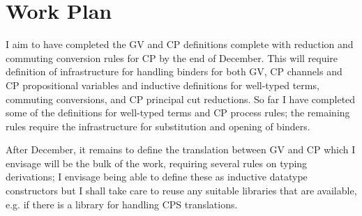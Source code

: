 \documentclass{mprop}
\begin{document}
\section{Work Plan}

I aim to have completed the GV and CP definitions complete with reduction and commuting conversion rules for CP by the end of December. This will require definition of infrastructure for handling binders for both GV, CP channels and CP propositional variables and inductive definitions for well-typed terms, commuting conversions, and CP principal cut reductions. So far I have completed some of the definitions for well-typed terms and CP process rules; the remaining rules require the infrastructure for substitution and opening of binders.

After December, it remains to define the translation between GV and CP which I envisage will be the bulk of the work, requiring several rules on typing derivations; I envisage being able to define these as inductive datatype constructors but I shall take care to reuse any suitable libraries that are available, e.g. if there is a library for handling CPS translations.


\printbibliography
\end{document}

